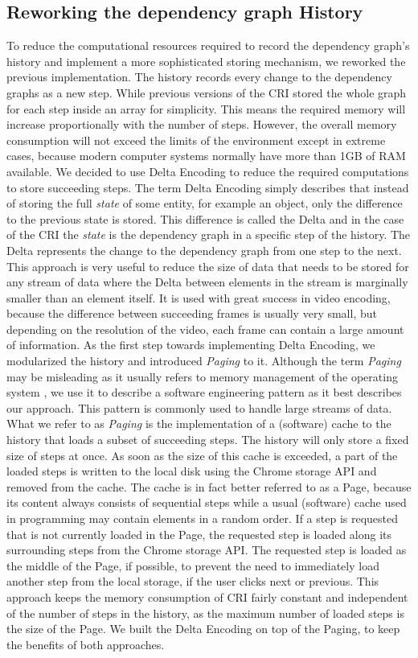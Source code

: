 \subsection{Reworking the dependency graph History}
To reduce the computational resources required to record the dependency graph's history and implement a more sophisticated storing mechanism, we reworked the previous implementation. The history records every change to the dependency graphs as a new step. While previous versions of the CRI stored the whole graph for each step inside an array for simplicity. This means the required memory will increase proportionally with the number of steps. However, the overall memory consumption will not exceed the limits of the environment except in extreme cases, because modern computer systems normally have more than 1GB of RAM available. We decided to use Delta Encoding to reduce the required computations to store succeeding steps. The term Delta Encoding simply describes that instead of storing the full \emph{state} of some entity, for example an object, only the difference to the previous state is stored. This difference is called the Delta and in the case of the CRI the \emph{state} is the dependency graph in a specific step of the history. The Delta represents the change to the dependency graph from one step to the next. This approach is very useful to reduce the size of data that needs to be stored for any stream of data where the Delta between elements in the stream is marginally smaller than an element itself. It is used with great success in video encoding, because the difference between succeeding frames is usually very small, but depending on the resolution of the video, each frame can contain a large amount of information.
As the first step towards implementing Delta Encoding, we modularized the history and introduced \emph{Paging} to it. Although the term \emph{Paging} may be misleading as it usually refers to memory management of the operating system \cite{PagingWiki}, we use it to describe a software engineering pattern as it best describes our approach. This pattern is commonly used to handle large streams of data. What we refer to as \emph{Paging} is the implementation of a (software) cache to the history that loads a subset of succeeding steps. The history will only store a fixed size of steps at once. As soon as the size of this cache is exceeded, a part of the loaded steps is written to the local disk using the Chrome storage API and removed from the cache. The cache is in fact better referred to as a Page, because its content always consists of sequential steps while a usual (software) cache used in programming may contain elements in a random order. If a step is requested that is not currently loaded in the Page, the requested step is loaded along its surrounding steps from the Chrome storage API. The requested step is loaded as the middle of the Page, if possible, to prevent the need to immediately load another step from the local storage, if the user clicks next or previous. This approach keeps the memory consumption of CRI fairly constant and independent of the number of steps in the history, as the maximum number of loaded steps is the size of the Page. We built the Delta Encoding on top of the Paging, to keep the benefits of both approaches.
